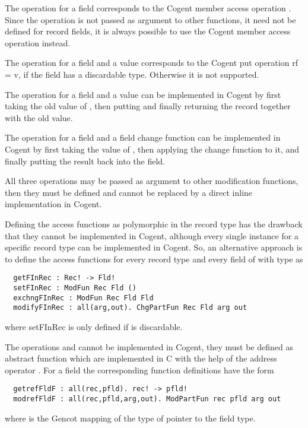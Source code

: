 The operation  for a field  corresponds to the Cogent member access operation .
Since the  operation is not passed as argument to other functions, it need not be defined for record fields, it is always possible
to use the Cogent member access operation instead.

The operation  for a field  and a value  corresponds to the Cogent put operation r{f = v}, if
the field has a discardable type. Otherwise it is not supported.

The operation  for a field  and a value  can be implemented in Cogent by first taking the 
old value of , then putting  and finally returning the record together with the old value.

The operation  for a field  and a field change function can be implemented in Cogent 
by first taking the value of , then applying the change function to it, and finally putting the result back into
the field. 

All three operations may be passed as argument to other modification functions, then they must be defined and cannot be replaced
by a direct inline implementation in Cogent.

Defining the access functions as polymorphic in the record type has the drawback that they cannot be implemented in Cogent, 
although every single instance for a specific record type can be implemented in Cogent. So, an alternative approach is to
define the access functions for every record type  and every field  of  with type  as
\begin{verbatim}
  getFInRec : Rec! -> Fld!
  setFInRec : ModFun Rec Fld ()
  exchngFInRec : ModFun Rec Fld Fld
  modifyFInRec : all(arg,out). ChgPartFun Rec Fld arg out
\end{verbatim}
where setFInRec is only defined if  is discardable.

The operations  and  cannot be implemented in Cogent, they must be defined as abstract function which are implemented in 
C with the help of the address operator \code{\&}. For a field  the corresponding function definitions have the form
\begin{verbatim}
  getrefFldF : all(rec,pfld). rec! -> pfld!
  modrefFldF : all(rec,pfld,arg,out). ModPartFun rec pfld arg out
\end{verbatim}
where  is the Gencot mapping of the type of pointer to the field type. 

